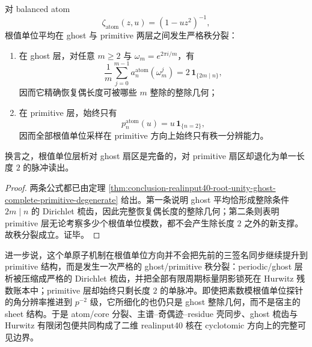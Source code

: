 

\begin{corollary}\label{cor:conclusion-realinput40-root-unity-ghost-primitive-rank-split}
对 balanced atom
\[
\zeta_{\mathrm{atom}}(z,u)=(1-uz^2)^{-1},
\]
根值单位平均在 ghost 与 primitive 两层之间发生严格秩分裂：
\begin{enumerate}
  \item 在 ghost 层，对任意 \(m\ge 2\) 与 \(\omega_m=e^{2\pi i/m}\)，有
  \[
  \frac{1}{m}\sum_{j=0}^{m-1}a_n^{\mathrm{atom}}(\omega_m^j)
  =
  2\,\mathbf 1_{\{2m\mid n\}},
  \]
  因而它精确恢复偶长度可被哪些 \(m\) 整除的整除几何；
  \item 在 primitive 层，始终只有
  \[
  p_n^{\mathrm{atom}}(u)=u\,\mathbf 1_{\{n=2\}},
  \]
  因而全部根值单位采样在 primitive 方向上始终只有秩一分辨能力。
\end{enumerate}
换言之，根值单位层析对 ghost 扇区是完备的，对 primitive 扇区却退化为单一长度 \(2\) 的脉冲读出。
\end{corollary}
\begin{proof}
两条公式都已由定理 \ref{thm:conclusion-realinput40-root-unity-ghost-complete-primitive-degenerate} 给出。第一条说明 ghost 平均恰形成整除条件 \(2m\mid n\) 的 Dirichlet 梳齿，因此完整恢复偶长度的整除几何；第二条则表明 primitive 层无论考察多少个根值单位模数，都不会产生除长度 \(2\) 之外的新支撑。故秩分裂成立。证毕。
\end{proof}

进一步说，这个单原子机制在根值单位方向并不会把先前的三签名同步继续提升到 primitive 结构，而是发生一次严格的 ghost/primitive 秩分裂：periodic/ghost 层析被压缩成严格的 Dirichlet 梳齿，并把全部有限周期标量阴影锁死在 Hurwitz 残数账本中；primitive 层却始终只剩长度 \(2\) 的单脉冲。即使把素数模根值单位探针的角分辨率推进到 \(p^{-2}\) 级，它所细化的也仍只是 ghost 整除几何，而不是宿主的 sheet 结构。于是 atom/core 分裂、主谱--奇偶迹--residue 壳同步、ghost 梳齿与 Hurwitz 有限闭包便共同构成了二维 realinput40 核在 cyclotomic 方向上的完整可见边界。

\endinput
